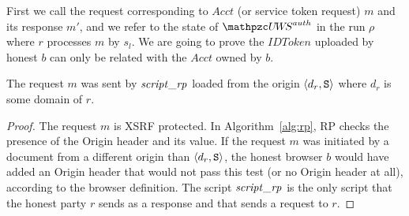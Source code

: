   First we call the request corresponding to $Acct$ (or service token request) $m$ and
  its response $m'$, and we refer to the state of $\uppressoauthwebsystem$ in the run 
  $\rho$ where $r$ processes $m$ by $s_l$. We are going to prove the $IDToken$ uploaded 
  by honest $b$ can only be related with the $Acct$ owned by $b$.
  
  
  \begin{lemma}\label{lemma:request-m-is-from-script-rp}
    The request $m$ was sent by $\mathit{script\_rp}$ loaded from 
    the origin $\langle d_r, \mathtt{S}\rangle$ where $d_r$ is some domain of 
    $r$.
  \end{lemma}
  
  \begin{proof}
    The request $m$ is XSRF protected. In Algorithm~\ref{alg:rp}, 
    RP checks the presence of the Origin header and its value. 
    If the request $m$ was initiated by a document from a 
    different origin than $\langle d_r, \mathtt{S}\rangle$, the honest browser 
    $b$ would have added an Origin header that would not 
    pass this test (or no Origin header at all), according to 
    the browser definition. The script $\mathit{script\_rp}$ is the 
    only script that the honest party $r$ sends as a response 
    and that sends a request to $r$.
  \end{proof}
  
